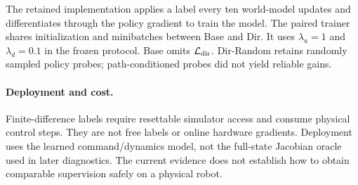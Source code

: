 The retained implementation applies a label every ten world-model updates and differentiates through the policy gradient to train the model. The paired trainer shares initialization and minibatches between Base and Dir. It uses $\lambda_u=1$ and $\lambda_d=0.1$ in the frozen protocol. Base omits $\mathcal L_{\rm dir}$. Dir-Random retains randomly sampled policy probes; path-conditioned probes did not yield reliable gains.

\paragraph{Deployment and cost.}
Finite-difference labels require resettable simulator access and consume physical control steps. They are not free labels or online hardware gradients. Deployment uses the learned command/dynamics model, not the full-state Jacobian oracle used in later diagnostics. The current evidence does not establish how to obtain comparable supervision safely on a physical robot.
